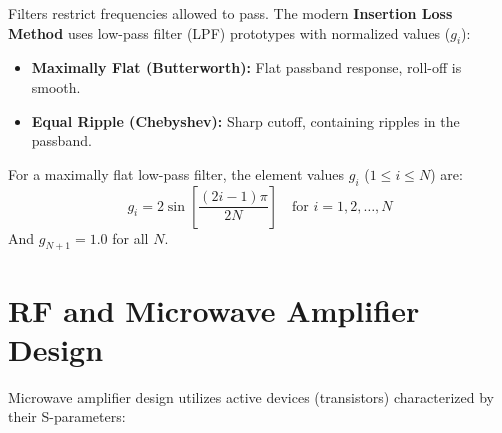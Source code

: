 \documentclass[12pt,a4paper]{article}
\begin{document}
Filters restrict frequencies allowed to pass. The modern \textbf{Insertion Loss Method} uses low-pass filter (LPF) prototypes with normalized values ($g_i$):
\begin{itemize}[leftmargin=*, itemsep=3pt]
  \item \textbf{Maximally Flat (Butterworth):} Flat passband response, roll-off is smooth.
  \item \textbf{Equal Ripple (Chebyshev):} Sharp cutoff, containing ripples in the passband.
\end{itemize}

\begin{tcolorbox}[formulabox, title={\textbf{Butterworth Prototype Values}}]
For a maximally flat low-pass filter, the element values $g_i$ ($1 \le i \le N$) are:
\begin{equation}
  g_i = 2 \sin \left[ \frac{(2i-1)\pi}{2N} \right] \quad \text{for } i = 1, 2, \dots, N
\end{equation}
And $g_{N+1} = 1.0$ for all $N$.
\end{tcolorbox}

\section{RF and Microwave Amplifier Design}

Microwave amplifier design utilizes active devices (transistors) characterized by their S-parameters:

\begin{tcolorbox}[tikzbox, title={Microwave Transistor Amplifier Block Diagram}]
\centering
{}
\end{tcolorbox}
\end{document}
